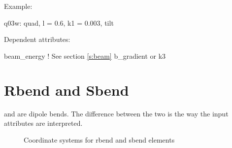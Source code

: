 \vskip0.05in \noindent
Example:
\begin{example}
  q03w: quad, l = 0.6, k1 = 0.003, tilt
\end{example}

\vskip0.05in \noindent
Dependent attributes:
\begin{example}
  beam\_energy  ! See section \ref{s:beam}
  b\_gradient or k3
\end{example}

\section{Rbend and Sbend}
\label{s:bend}

 and  are dipole bends. The difference between
the two is the way the input attributes are interpreted.
\begin{figure}
  \centering
  \hspace{1cm}
  \caption{Coordinate systems for rbend and sbend elements}
\end{figure}
  

